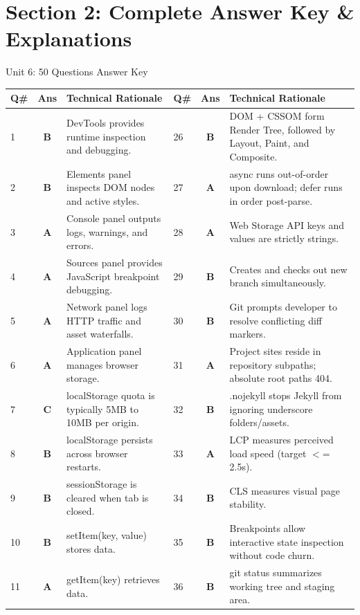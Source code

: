 \newpage
\section{Section 2: Complete Answer Key \& Explanations}

\begin{answerkeytable}{Unit 6: 50 Questions Answer Key}
\begin{tabularx}{\textwidth}{l c X l c X}
\toprule
\textbf{Q\#} & \textbf{Ans} & \textbf{Technical Rationale} & \textbf{Q\#} & \textbf{Ans} & \textbf{Technical Rationale} \\
\midrule
1 & \textbf{B} & DevTools provides runtime inspection and debugging. & 26 & \textbf{B} & DOM + CSSOM form Render Tree, followed by Layout, Paint, and Composite. \\
2 & \textbf{B} & Elements panel inspects DOM nodes and active styles. & 27 & \textbf{A} & async runs out-of-order upon download; defer runs in order post-parse. \\
3 & \textbf{A} & Console panel outputs logs, warnings, and errors. & 28 & \textbf{A} & Web Storage API keys and values are strictly strings. \\
4 & \textbf{A} & Sources panel provides JavaScript breakpoint debugging. & 29 & \textbf{B} & Creates and checks out new branch simultaneously. \\
5 & \textbf{A} & Network panel logs HTTP traffic and asset waterfalls. & 30 & \textbf{B} & Git prompts developer to resolve conflicting diff markers. \\
6 & \textbf{A} & Application panel manages browser storage. & 31 & \textbf{A} & Project sites reside in repository subpaths; absolute root paths 404. \\
7 & \textbf{C} & localStorage quota is typically 5MB to 10MB per origin. & 32 & \textbf{B} & .nojekyll stops Jekyll from ignoring underscore folders/assets. \\
8 & \textbf{B} & localStorage persists across browser restarts. & 33 & \textbf{A} & LCP measures perceived load speed (target $<$= 2.5s). \\
9 & \textbf{B} & sessionStorage is cleared when tab is closed. & 34 & \textbf{B} & CLS measures visual page stability. \\
10 & \textbf{B} & setItem(key, value) stores data. & 35 & \textbf{B} & Breakpoints allow interactive state inspection without code churn. \\
11 & \textbf{A} & getItem(key) retrieves data. & 36 & \textbf{B} & git status summarizes working tree and staging area. \\

\end{tabularx}
\end{answerkeytable}
